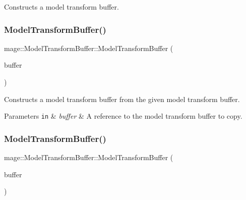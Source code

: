 Constructs a model transform buffer. \hypertarget{structmage_1_1_model_transform_buffer_ad34272500e8c61dccb14a1e52af4fe73}{}\label{structmage_1_1_model_transform_buffer_ad34272500e8c61dccb14a1e52af4fe73} 
\subsubsection{\texorpdfstring{Model\+Transform\+Buffer()}{ModelTransformBuffer()}\hspace{0.1cm}{\footnotesize\ttfamily [2/3]}}
{\footnotesize\ttfamily mage\+::\+Model\+Transform\+Buffer\+::\+Model\+Transform\+Buffer (\begin{DoxyParamCaption}\item[{const \hyperlink{structmage_1_1_model_transform_buffer}{Model\+Transform\+Buffer} \&}]{buffer }\end{DoxyParamCaption})\hspace{0.3cm}{\ttfamily [default]}}

Constructs a model transform buffer from the given model transform buffer.


\begin{DoxyParams}[1]{Parameters}
\mbox{\tt in}  & {\em buffer} & A reference to the model transform buffer to copy. \\
\hline
\end{DoxyParams}
\hypertarget{structmage_1_1_model_transform_buffer_a3043efb7ecff1a81d8d5da4acfb47081}{}\label{structmage_1_1_model_transform_buffer_a3043efb7ecff1a81d8d5da4acfb47081} 
\subsubsection{\texorpdfstring{Model\+Transform\+Buffer()}{ModelTransformBuffer()}\hspace{0.1cm}{\footnotesize\ttfamily [3/3]}}
{\footnotesize\ttfamily mage\+::\+Model\+Transform\+Buffer\+::\+Model\+Transform\+Buffer (\begin{DoxyParamCaption}\item[{\hyperlink{structmage_1_1_model_transform_buffer}{Model\+Transform\+Buffer} \&\&}]{buffer }\end{DoxyParamCaption})\hspace{0.3cm}{\ttfamily [default]}}

